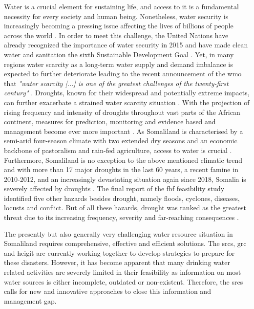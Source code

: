 Water is a crucial element for sustaining life, and access to it is a fundamental necessity for every society and human being. Nonetheless, water security is increasingly becoming a pressing issue affecting the lives of billions of people across the world \autocite{caretta2022water}. In order to meet this challenge, the United Nations have already recognized the importance of water security in 2015 and have made clean water and sanitation the sixth Sustainable Development Goal \autocite{unGoalEnsureAvailability2016}. Yet, in many regions water scarcity as a long-term water supply and demand imbalance is expected to further deteriorate leading to the recent announcement of the \acrlong{wmo} that \textit{"water scarcity [...] is one of the greatest challenges of the twenty-first century"} \autocite[7]{idmpDroughtWaterScarcity2022}.\newline
Droughts, known for their widespread and potentially extreme impacts, can further exacerbate a strained water scarcity situation \autocite{idmpDroughtWaterScarcity2022}. With the projection of rising frequency and intensity of droughts throughout vast parts of the African continent, measures for prediction, monitoring and evidence based  and management become ever more important \autocite{abdulkadirAssessmentDroughtRecurrence2017,trisosAfrica2022,vereintenationenSpecialReportDrought2021}.\newline
As Somaliland is characterised by a semi-arid four-season climate with two extended dry seasons and an economic backbone of pastoralism and rain-fed agriculture, access to water is crucial \autocite{abdulkadirAssessmentDroughtRecurrence2017,petrucciLandscapeLandformsNorthern2022,republicofsomalilandSomalilandCountryProfile2021}. Furthermore, Somaliland is no exception to the above mentioned climatic trend and with more than 17 major droughts in the last 60 years, a recent famine in 2010-2012, and an increasingly devastating situation again since 2018, Somalia is severely affected by droughts \autocite{abdulkadirAssessmentDroughtRecurrence2017,credEMDATInternationalDisasters2023}. The final report of the \acrfull{fbf} feasibility study identified five other hazards besides drought, namely floods, cyclones, diseases, locusts and conflict. But of all these hazards, drought was ranked as the greatest threat due to its increasing frequency, severity and far-reaching consequences \autocite{scrsFeasibilityStudyPotential2022}.\newline

The presently but also generally very challenging water resource situation in Somaliland requires comprehensive, effective and efficient solutions. The \acrfull{srcs}, \acrfull{grc} and \acrfull{heigit} are currently working together to develop strategies to prepare for these disasters. However, it has become apparent that many drinking water related activities are severely limited in their feasibility as information on most water sources is either incomplete, outdated or non-existent. Therefore, the \acrshort{srcs} calls for new and innovative approaches to close this information and management gap.

